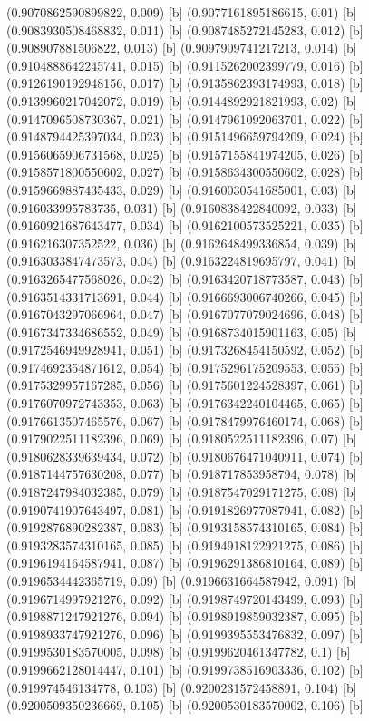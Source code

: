 {{{(0.9070862590899822, 0.009) [b] 
(0.9077161895186615, 0.01) [b] 
(0.9083930508468832, 0.011) [b] 
(0.9087485272145283, 0.012) [b] 
(0.908907881506822, 0.013) [b] 
(0.9097909741217213, 0.014) [b] 
(0.9104888642245741, 0.015) [b] 
(0.9115262002399779, 0.016) [b] 
(0.9126190192948156, 0.017) [b] 
(0.9135862393174993, 0.018) [b] 
(0.9139960217042072, 0.019) [b] 
(0.9144892921821993, 0.02) [b] 
(0.9147096508730367, 0.021) [b] 
(0.9147961092063701, 0.022) [b] 
(0.9148794425397034, 0.023) [b] 
(0.9151496659794209, 0.024) [b] 
(0.9156065906731568, 0.025) [b] 
(0.9157155841974205, 0.026) [b] 
(0.9158571800550602, 0.027) [b] 
(0.9158634300550602, 0.028) [b] 
(0.9159669887435433, 0.029) [b] 
(0.9160030541685001, 0.03) [b] 
(0.916033995783735, 0.031) [b] 
(0.9160838422840092, 0.033) [b] 
(0.9160921687643477, 0.034) [b] 
(0.9162100573525221, 0.035) [b] 
(0.916216307352522, 0.036) [b] 
(0.9162648499336854, 0.039) [b] 
(0.9163033847473573, 0.04) [b] 
(0.9163224819695797, 0.041) [b] 
(0.9163265477568026, 0.042) [b] 
(0.9163420718773587, 0.043) [b] 
(0.9163514331713691, 0.044) [b] 
(0.9166693006740266, 0.045) [b] 
(0.9167043297066964, 0.047) [b] 
(0.9167077079024696, 0.048) [b] 
(0.9167347334686552, 0.049) [b] 
(0.9168734015901163, 0.05) [b] 
(0.9172546949928941, 0.051) [b] 
(0.9173268454150592, 0.052) [b] 
(0.9174692354871612, 0.054) [b] 
(0.9175296175209553, 0.055) [b] 
(0.9175329957167285, 0.056) [b] 
(0.9175601224528397, 0.061) [b] 
(0.9176070972743353, 0.063) [b] 
(0.9176342240104465, 0.065) [b] 
(0.9176613507465576, 0.067) [b] 
(0.9178479976460174, 0.068) [b] 
(0.9179022511182396, 0.069) [b] 
(0.9180522511182396, 0.07) [b] 
(0.9180628339639434, 0.072) [b] 
(0.9180676471040911, 0.074) [b] 
(0.9187144757630208, 0.077) [b] 
(0.918717853958794, 0.078) [b] 
(0.9187247984032385, 0.079) [b] 
(0.9187547029171275, 0.08) [b] 
(0.9190741907643497, 0.081) [b] 
(0.9191826977087941, 0.082) [b] 
(0.9192876890282387, 0.083) [b] 
(0.9193158574310165, 0.084) [b] 
(0.9193283574310165, 0.085) [b] 
(0.9194918122921275, 0.086) [b] 
(0.9196194164587941, 0.087) [b] 
(0.9196291386810164, 0.089) [b] 
(0.9196534442365719, 0.09) [b] 
(0.9196631664587942, 0.091) [b] 
(0.9196714997921276, 0.092) [b] 
(0.9198749720143499, 0.093) [b] 
(0.9198871247921276, 0.094) [b] 
(0.9198919859032387, 0.095) [b] 
(0.9198933747921276, 0.096) [b] 
(0.9199395553476832, 0.097) [b] 
(0.9199530183570005, 0.098) [b] 
(0.9199620461347782, 0.1) [b] 
(0.9199662128014447, 0.101) [b] 
(0.9199738516903336, 0.102) [b] 
(0.919974546134778, 0.103) [b] 
(0.9200231572458891, 0.104) [b] 
(0.9200509350236669, 0.105) [b] 
(0.9200530183570002, 0.106) [b] 
}}}
